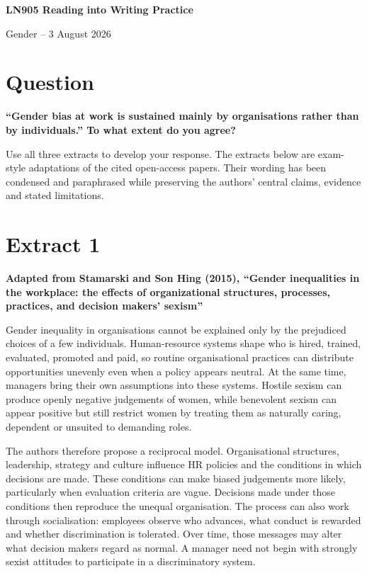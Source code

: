 \documentclass[11pt,a4paper]{article}
\newcommand{\sourceheading}[2]{%
  \section*{#1}
  \textbf{#2}\par\medskip
}
\begin{document}
\begin{center}
  {\Large\bfseries LN905 Reading into Writing Practice}\par
  \vspace{4pt}
  {\large Gender -- 3 August 2026}
\end{center}

\section*{Question}

\textbf{``Gender bias at work is sustained mainly by organisations rather than by individuals.'' To what extent do you agree?}

Use all three extracts to develop your response. The extracts below are exam-style adaptations of the cited open-access papers. Their wording has been condensed and paraphrased while preserving the authors' central claims, evidence and stated limitations.

\sourceheading{Extract 1}{Adapted from Stamarski and Son Hing (2015), ``Gender inequalities in the workplace: the effects of organizational structures, processes, practices, and decision makers' sexism''}

Gender inequality in organisations cannot be explained only by the prejudiced choices of a few individuals. Human-resource systems shape who is hired, trained, evaluated, promoted and paid, so routine organisational practices can distribute opportunities unevenly even when a policy appears neutral. At the same time, managers bring their own assumptions into these systems. Hostile sexism can produce openly negative judgements of women, while benevolent sexism can appear positive but still restrict women by treating them as naturally caring, dependent or unsuited to demanding roles.

The authors therefore propose a reciprocal model. Organisational structures, leadership, strategy and culture influence HR policies and the conditions in which decisions are made. These conditions can make biased judgements more likely, particularly when evaluation criteria are vague. Decisions made under those conditions then reproduce the unequal organisation. The process can also work through socialisation: employees observe who advances, what conduct is rewarded and whether discrimination is tolerated. Over time, those messages may alter what decision makers regard as normal. A manager need not begin with strongly sexist attitudes to participate in a discriminatory system.
\end{document}
